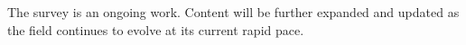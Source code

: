 The survey is an ongoing work.
Content will be further expanded and updated as the field continues to
evolve at its current rapid pace.







